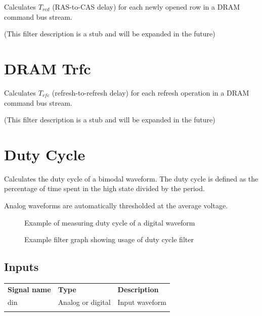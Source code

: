 Calculates $T_{rcd}$ (RAS-to-CAS delay) for each newly opened row in a DRAM command bus stream.

(This filter description is a stub and will be expanded in the future)

\pagebreak
\section{DRAM Trfc}
\label{filter:dramtrfc}

Calculates $T_{rfc}$ (refresh-to-refresh delay) for each refresh operation in a DRAM command bus stream.

(This filter description is a stub and will be expanded in the future)

\pagebreak
\section{Duty Cycle}
\label{filter:dutycycle}

Calculates the duty cycle of a bimodal waveform. The duty cycle is defined as the percentage of time spent in the high
state divided by the period.

Analog waveforms are automatically thresholded at the average voltage.

\begin{figure}[h]
\centering
{}
\caption{Example of measuring duty cycle of a digital waveform}
\label{filter_dutycycle}
\end{figure}

\begin{figure}[h]
\centering
{}
\caption{Example filter graph showing usage of duty cycle filter}
\label{filter_dutycycle}
\end{figure}

\FloatBarrier

\subsection{Inputs}

\begin{tabularx}{16cm}{llX}
\thickhline
\textbf{Signal name} & \textbf{Type} & \textbf{Description} \\
\thickhline
din & Analog or digital & Input waveform\\
\thickhline
\end{tabularx}

